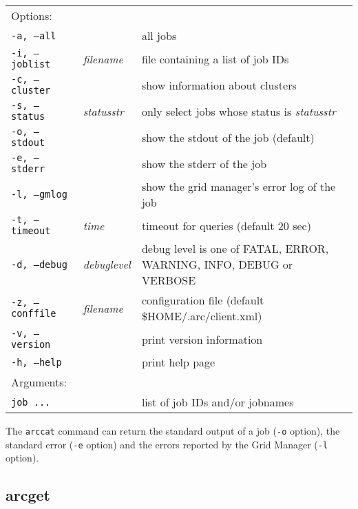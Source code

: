 \hspace*{0.5cm}
\begin{shaded}
\end{shaded}
\begin{longtable}{llp{8cm}}
   Options:&&\\
   \texttt{-a, --all}& & all jobs\\
   \texttt{-i, --joblist}& \textit{filename} & file containing a list of job IDs\\
   \texttt{-c, --cluster}& & show information about clusters\\
   \texttt{-s, --status}& \textit{statusstr} &only select jobs whose status is \textit{statusstr}\\
   \texttt{-o, --stdout}& & show the stdout of the job (default)\\
   \texttt{-e, --stderr}& & show the stderr of the job\\
   \texttt{-l, --gmlog}& & show the grid manager's error log of the job\\
   \texttt{-t, --timeout}& \textit{time} & timeout for queries (default 20 sec)\\
   \texttt{-d, --debug}& \textit{debuglevel}&debug level is one of  FATAL, ERROR, WARNING, INFO, DEBUG or VERBOSE\\
   \texttt{-z, --conffile}&\textit{filename}& configuration file (default {\$}HOME/.arc/client.xml)\\
   \texttt{-v, --version}& & print version information\\
   \texttt{-h, --help}& & print help page\\
   Arguments:&&\\
   \texttt{job ...} && list of job IDs and/or jobnames\\
\end{longtable}

The \texttt{arccat} command can return the standard output of a job
(\texttt{-o} option), the standard error (\texttt{-e} option) and the
errors reported by the Grid Manager (\texttt{-l} option).

\begin{framed}

\end{framed}


\subsection{arcget}
\label{sec:arcget}

